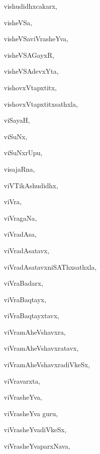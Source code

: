 \begin{multicols}{3}
{\noindent
{vishudidhxcakarx}, \pageref{vishudidhxcakarx}

\noindent
{visheVSa}, \pageref{visheVSa}

\noindent
{visheVSaviVrasheYva}, \pageref{visheVSaviVrasheYva}

\noindent
{visheVSAGayxR}, \pageref{visheVSAGayxR}

\noindent
{visheVSAdevxYta}, \pageref{visheVSAdevxYta}

\noindent
{vishovxVtapxtitx}, \pageref{vishovxVtapxtitx}

\noindent
{vishovxVtapxtitxsathxla}, \pageref{vishovxVtapxtitxsathxla}

\noindent
{viSayaH}, \pageref{viSayaH}

\noindent
{viSuNx}, \pageref{viSuNx}

\noindent
{viSuNxrUpu}, \pageref{viSuNxrUpu}

\noindent
{visajaRna}, \pageref{visajaRna}

\noindent
{viVTikAshudidhx}, \pageref{viVTikAshudidhx}

\noindent
{viVra}, \pageref{viVra}

\noindent
{viVragaNa}, \pageref{viVragaNa}

\noindent
{viVradAsa}, \pageref{viVradAsa}

\noindent
{viVradAsatavx}, \pageref{viVradAsatavx}

\noindent
{viVradAsatavxniSAThxsathxla}, \pageref{viVradAsatavxniSAThxsathxla}

\noindent
{viVraBadarx}, \pageref{viVraBadarx}

\noindent
{viVraBaqtayx}, \pageref{viVraBaqtayx}

\noindent
{viVraBaqtayxtavx}, \pageref{viVraBaqtayxtavx}

\noindent
{viVramAheVshavxra}, \pageref{viVramAheVshavxra}

\noindent
{viVramAheVshavxratavx}, \pageref{viVramAheVshavxratavx}

\noindent
{viVramAheVshavxradiVkeSx}, \pageref{viVramAheVshavxradiVkeSx}

\noindent
{viVravarxta}, \pageref{viVravarxta}

\noindent
{viVrasheYva}, \pageref{viVrasheYva}

\noindent
{viVrasheYva guru}, \pageref{viVrasheYvaguru}

\noindent
{viVrasheYvadiVkeSx}, \pageref{viVrasheYvadiVkeSx}

\noindent
{viVrasheYvaparxNava}, \pageref{viVrasheYvaparxNava}

}
\end{multicols}
